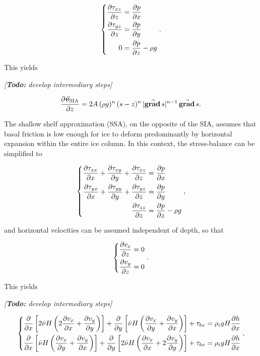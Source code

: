 \documentclass{article}
\newcommand{\todo}[1]{\emph{[\textbf{Todo:} #1]}}
\newcommand{\vect}[1]{\va*{#1}} %
\renewcommand{\grad}[1]{\vect{\mathrm{grad}}\,#1}   %
\newcommand{\vv}[0]{\vect{v}}           %
\newcommand{\vsia}[0]{\vv_{\mathrm{SIA}}}   %
\begin{document}
\begin{equation}
    \left\{\begin{aligned}
        \pdv{\tau_{xz}}{z} &= \pdv{p}{x} \\
        \pdv{\tau_{yz}}{z} &= \pdv{p}{y} \\
        0 &= \pdv{p}{z} - \rho g
    \end{aligned}\right..
\end{equation}

This yields

\todo{develop intermediary steps}

\begin{equation}
    \pdv{\vsia}{z} = 2A\,(\rho g)^n\,(s-z)^n\,|\grad{s}|^{n-1}\,\grad{s}.
\end{equation}

The shallow shelf approximation (SSA), on the opposite of the SIA, assumes that
basal friction is low enough for ice to deform predominantly by horizontal
expansion within the entire ice column. In this context, the stress-balance can
be simplified to

\begin{equation}
    \left\{\begin{aligned}
        \pdv{\tau_{xx}}{x} + \pdv{\tau_{xy}}{y} + \pdv{\tau_{xz}}{z}
            &= \pdv{p}{x} \\
        \pdv{\tau_{yx}}{x} + \pdv{\tau_{yy}}{y} + \pdv{\tau_{yz}}{z}
            &= \pdv{p}{y} \\
        \pdv{\tau_{zz}}{z} &= \pdv{p}{z} - \rho g
    \end{aligned}\right.,
\end{equation}

and horizontal velocities can be assumed independent of depth, so that

\begin{equation}
    \left\{\begin{aligned}
        \pdv{v_x}{z} &= 0 \\
        \pdv{v_y}{z} &= 0 \\
    \end{aligned}\right..
\end{equation}

This yields

\todo{develop intermediary steps}

\begin{equation}
    \left\{\begin{aligned}
        \pdv{x} \left[2\bar{\nu}H
                      \left(2\pdv{v_x}{x} + \pdv{v_y}{y}\right) \right]
            + \pdv{y} \left[\bar{\nu}H
                            \left(\pdv{v_x}{y} + \pdv{v_y}{x}\right) \right]
            + \tau_{bx} &= \rho_i gH \pdv{h}{x} \\
        \pdv{x} \left[\bar{\nu}H
                      \left(\pdv{v_x}{y} + \pdv{v_y}{x}\right) \right]
            + \pdv{y} \left[2\bar{\nu}H
                            \left(\pdv{v_x}{x} + 2\pdv{v_y}{y}\right) \right]
            + \tau_{bx} &= \rho_i gH \pdv{h}{x} \\
    \end{aligned}\right.,
\end{equation}
\end{document}
